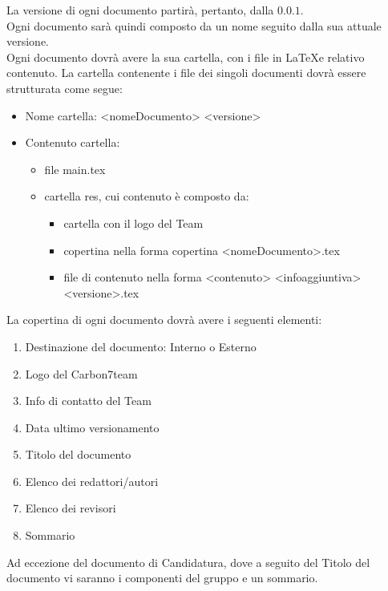La versione di ogni documento partirà, pertanto, dalla $0.0.1$.\\

Ogni documento sarà quindi composto da un nome seguito dalla sua attuale versione.\\
Ogni documento dovrà avere la sua cartella, con i file in \LaTeX e relativo contenuto.
La cartella contenente i file dei singoli documenti dovrà essere strutturata come segue:\
\begin{itemize}
    \item Nome cartella: <nomeDocumento> <versione>\\
    \item Contenuto cartella:\\
    \begin{itemize}
        \item file main.tex
        \item cartella res, cui contenuto è composto da:
        \begin{itemize}
            \item cartella con il logo del Team
            \item copertina nella forma copertina <nomeDocumento>.tex
            \item file di contenuto nella forma <contenuto> <infoaggiuntiva> <versione>.tex
        \end{itemize}
    \end{itemize}
\end{itemize}

La copertina di ogni documento dovrà avere i seguenti elementi:\\
\begin{enumerate}
    \item Destinazione del documento: Interno o Esterno
    \item Logo del Carbon7team
    \item Info di contatto del Team
    \item Data ultimo versionamento
    \item Titolo del documento
    \item Elenco dei redattori/autori
    \item Elenco dei revisori
    \item Sommario
\end{enumerate}

Ad eccezione del documento di Candidatura, dove a seguito del Titolo del documento vi saranno i componenti del gruppo e un sommario.

